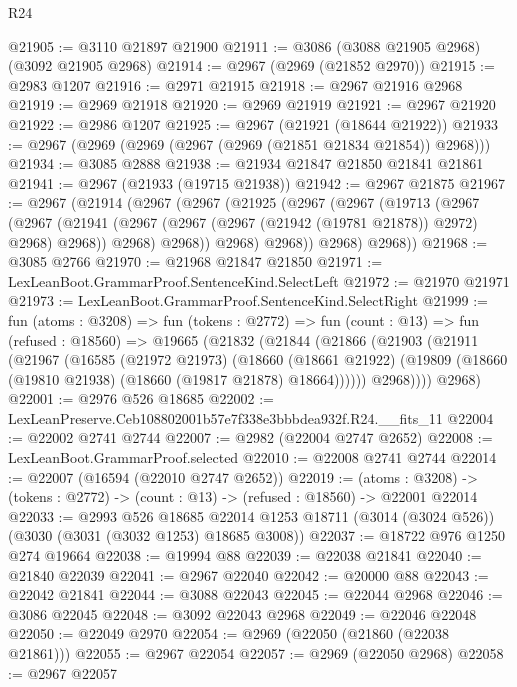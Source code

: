 \begin{lexlean}{R24}
\begin{coremodule}
@21905 := @3110 @21897 @21900
@21911 := @3086 (@3088 @21905 @2968) (@3092 @21905 @2968)
@21914 := @2967 (@2969 (@21852 @2970))
@21915 := @2983 @1207
@21916 := @2971 @21915
@21918 := @2967 @21916 @2968
@21919 := @2969 @21918
@21920 := @2969 @21919
@21921 := @2967 @21920
@21922 := @2986 @1207
@21925 := @2967 (@21921 (@18644 @21922))
@21933 := @2967 (@2969 (@2969 (@2967 (@2969 (@21851 @21834 @21854)) @2968)))
@21934 := @3085 @2888
@21938 := @21934 @21847 @21850 @21841 @21861
@21941 := @2967 (@21933 (@19715 @21938))
@21942 := @2967 @21875
@21967 := @2967
    (@21914
      (@2967
        (@2967
          (@21925
            (@2967
              (@2967
                (@19713
                  (@2967
                    (@2967
                      (@21941 (@2967 (@2967 (@2967 (@21942 (@19781 @21878)) @2972) @2968) @2968))
                      @2968)
                    @2968))
                @2968)
              @2968))
          @2968)
        @2968))
@21968 := @3085 @2766
@21970 := @21968 @21847 @21850
@21971 := LexLeanBoot.GrammarProof.SentenceKind.SelectLeft
@21972 := @21970 @21971
@21973 := LexLeanBoot.GrammarProof.SentenceKind.SelectRight
@21999 := fun (atoms : @3208) =>
  fun (tokens : @2772) =>
  fun (count : @13) =>
  fun (refused : @18560) =>
  @19665
    (@21832
      (@21844
        (@21866
          (@21903
            (@21911
              (@21967
                (@16585
                  (@21972 @21973)
                  (@18660
                    (@18661 @21922)
                    (@19809 (@18660 (@19810 @21938) (@18660 (@19817 @21878) @18664))))))
              @2968))))
      @2968)
@22001 := @2976 @526 @18685
@22002 := LexLeanPreserve.Ceb108802001b57e7f338e3bbbdea932f.R24.__fits_11
@22004 := @22002 @2741 @2744
@22007 := @2982 (@22004 @2747 @2652)
@22008 := LexLeanBoot.GrammarProof.selected
@22010 := @22008 @2741 @2744
@22014 := @22007 (@16594 (@22010 @2747 @2652))
@22019 := (atoms : @3208) ->
  (tokens : @2772) -> (count : @13) -> (refused : @18560) -> @22001 @22014
@22033 := @2993
    @526
    @18685
    @22014
    @1253
    @18711
    (@3014 (@3024 @526))
    (@3030 (@3031 (@3032 @1253) @18685 @3008))
@22037 := @18722 @976 @1250 @274 @19664
@22038 := @19994 @88
@22039 := @22038 @21841
@22040 := @21840 @22039
@22041 := @2967 @22040
@22042 := @20000 @88
@22043 := @22042 @21841
@22044 := @3088 @22043
@22045 := @22044 @2968
@22046 := @3086 @22045
@22048 := @3092 @22043 @2968
@22049 := @22046 @22048
@22050 := @22049 @2970
@22054 := @2969 (@22050 (@21860 (@22038 @21861)))
@22055 := @2967 @22054
@22057 := @2969 (@22050 @2968)
@22058 := @2967 @22057

\end{coremodule}
\end{lexlean}
